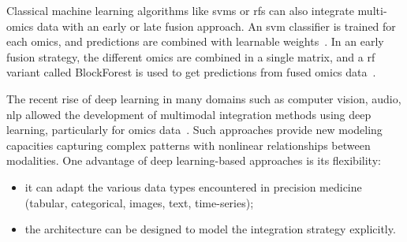 \documentclass[../main.tex]{subfiles}
\begin{document}
	  Classical machine learning algorithms like \glspl{svm} or \glspl{rf} can also integrate multi-omics data with an early or late fusion approach.
	  An \gls{svm} classifier is trained for each omics, and predictions are combined with learnable weights~\cite{CarrilloPerez2022}.
	  In an early fusion strategy, the different omics are combined in a single matrix, and a \gls{rf} variant called BlockForest is used to get predictions from fused omics data~\cite{Hornung2019}.

	  The recent rise of deep learning in many domains such as computer vision, audio, \gls{nlp} allowed the development of multimodal integration methods using deep learning, particularly for omics data~\cite{Kang2021}.
	  Such approaches provide new modeling capacities capturing complex patterns with nonlinear relationships between modalities.
	  One advantage of deep learning-based approaches is its flexibility:
	  \begin{itemize}[nosep]
	    \item it can adapt the various data types encountered in precision medicine (tabular, categorical, images, text, time-series);
	    \item the architecture can be designed to model the integration strategy explicitly.
	  \end{itemize}

\end{document}
